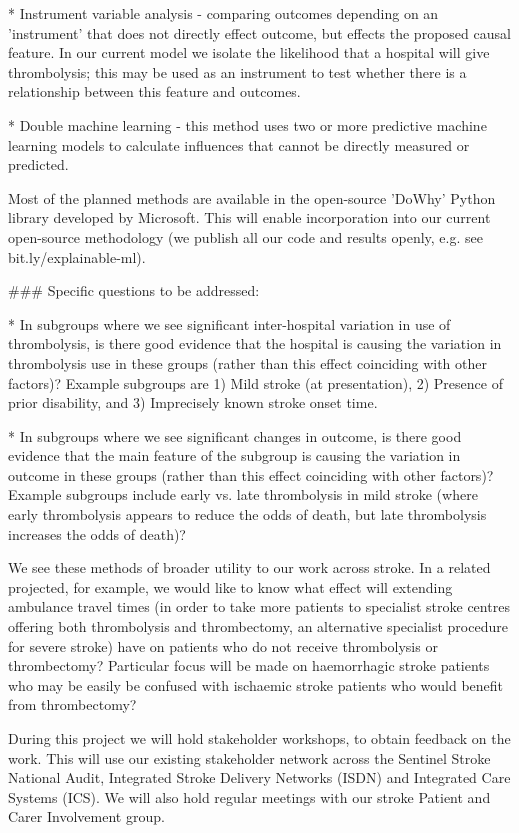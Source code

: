 \begin{markdown}
    * Instrument variable analysis - comparing outcomes depending on an 'instrument' that does not directly effect outcome, but effects the proposed causal feature. In our current model we isolate the likelihood that a hospital will give thrombolysis; this may be used as an instrument to test whether there is a relationship between this feature and outcomes.
    
    * Double machine learning - this method uses two or more predictive machine learning models to calculate influences that cannot be directly measured or predicted.

Most of the planned methods are available in the open-source 'DoWhy' Python library developed by Microsoft. This will enable incorporation into our current open-source methodology (we publish all our code and results openly, e.g. see bit.ly/explainable-ml).
 
### Specific questions to be addressed:

* In subgroups where we see significant inter-hospital variation in use of thrombolysis, is there good evidence that the hospital is causing the variation in thrombolysis use in these groups (rather than this effect coinciding with other factors)? Example subgroups are 1) Mild stroke (at presentation), 2) Presence of prior disability, and 3) Imprecisely known stroke onset time.

* In subgroups where we see significant changes in outcome, is there good evidence that the main feature of the subgroup is causing the variation in outcome in these groups (rather than this effect coinciding with other factors)? Example subgroups include early vs. late thrombolysis in mild stroke (where early thrombolysis appears to reduce the odds of death, but late thrombolysis increases the odds of death)?

We see these methods of broader utility to our work across stroke. In a related projected, for example, we would like to know what effect will extending ambulance travel times (in order to take more patients to specialist stroke centres offering both thrombolysis and thrombectomy, an alternative specialist procedure for severe stroke) have on patients who do not receive thrombolysis or thrombectomy? Particular focus will be made on haemorrhagic stroke patients who may be easily be confused with ischaemic stroke patients who would benefit from thrombectomy?

During this project we will hold stakeholder workshops, to obtain feedback on the work. This will use our existing stakeholder network across the Sentinel Stroke National Audit, Integrated Stroke Delivery Networks (ISDN) and Integrated Care Systems (ICS). We will also hold regular meetings with our stroke Patient and Carer Involvement group.


\end{markdown}
